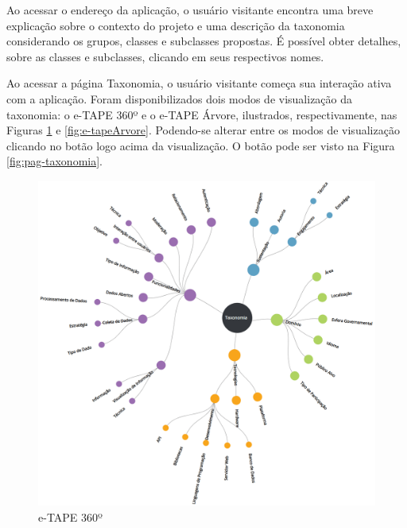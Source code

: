 \par
Ao acessar o endereço da aplicação, o usuário visitante encontra uma breve explicação sobre o contexto do projeto e uma descrição da taxonomia considerando os grupos,
classes e subclasses propostas. É possível obter detalhes, sobre as classes e subclasses, clicando em seus respectivos nomes. 

\par
Ao acessar a página Taxonomia, o usuário visitante começa sua interação ativa com a aplicação.
Foram disponibilizados dois modos de visualização da taxonomia: o e-TAPE 360º e o e-TAPE Árvore, ilustrados, respectivamente,
nas Figuras \ref{fig:e-tape360} e \ref{fig:e-tapeArvore}. Podendo-se alterar entre os modos de visualização clicando no botão logo acima da visualização.
O botão pode ser visto na Figura \ref{fig:pag-taxonomia}.

\vspace{1cm}

\begin{figure}[!ht]
    \centering
    \includegraphics[scale=0.20]{./figuras/taxonomia-cropped.png}
    \caption{e-TAPE 360º}
    \label{fig:e-tape360}
\end{figure}

\vspace{1cm}

